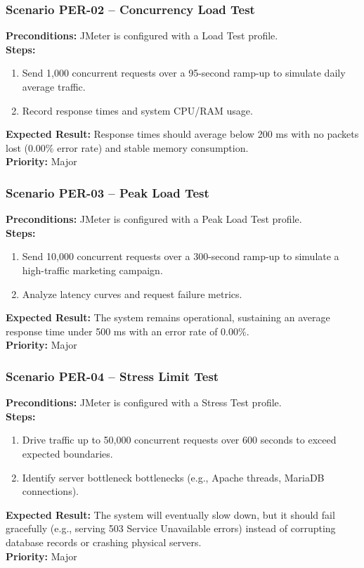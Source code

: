 \documentclass[12pt,a4paper]{article}
\begin{document}
\subsubsection*{Scenario PER-02 – Concurrency Load Test}
\textbf{Preconditions:} JMeter is configured with a Load Test profile.\\
\textbf{Steps:}
\begin{enumerate}
\item Send 1,000 concurrent requests over a 95-second ramp-up to simulate daily average traffic.
\item Record response times and system CPU/RAM usage.
\end{enumerate}
\textbf{Expected Result:} Response times should average below 200 ms with no packets lost (0.00\% error rate) and stable memory consumption.\\
\textbf{Priority:} Major

\subsubsection*{Scenario PER-03 – Peak Load Test}
\textbf{Preconditions:} JMeter is configured with a Peak Load Test profile.\\
\textbf{Steps:}
\begin{enumerate}
\item Send 10,000 concurrent requests over a 300-second ramp-up to simulate a high-traffic marketing campaign.
\item Analyze latency curves and request failure metrics.
\end{enumerate}
\textbf{Expected Result:} The system remains operational, sustaining an average response time under 500 ms with an error rate of 0.00\%.\\
\textbf{Priority:} Major

\subsubsection*{Scenario PER-04 – Stress Limit Test}
\textbf{Preconditions:} JMeter is configured with a Stress Test profile.\\
\textbf{Steps:}
\begin{enumerate}
\item Drive traffic up to 50,000 concurrent requests over 600 seconds to exceed expected boundaries.
\item Identify server bottleneck bottlenecks (e.g., Apache threads, MariaDB connections).
\end{enumerate}
\textbf{Expected Result:} The system will eventually slow down, but it should fail gracefully (e.g., serving 503 Service Unavailable errors) instead of corrupting database records or crashing physical servers.\\
\textbf{Priority:} Major
\end{document}

